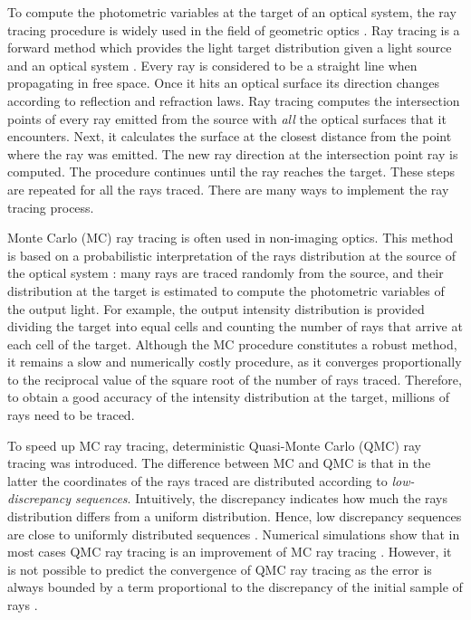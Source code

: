To compute the photometric variables at the target of an
optical system, the ray tracing procedure is widely used in the field of geometric optics \cite{glassner1989introduction}.
Ray tracing is a forward method which provides the light target distribution given a light source and an optical system \cite{Gross2005Handbook}. Every ray is considered to be a straight line when propagating in free space. Once it hits an optical surface its direction changes according to reflection and refraction laws. Ray tracing computes the intersection points of every ray emitted from the source with \textit{all} the optical surfaces that it encounters. Next, it calculates the surface at the closest distance from the point where the ray was emitted. The new ray direction at the intersection point ray is computed. The procedure continues until the ray reaches the target. These steps are repeated for all the rays traced.
There are many ways to implement the ray tracing process.

Monte Carlo (MC) ray tracing is often used in non-imaging
optics. This method is based on a probabilistic interpretation
of the rays distribution at the source of the optical
system \cite{liu2010precise,Ting:1}: many rays are traced randomly from the source,
and their distribution at the target is estimated to compute the
photometric variables of the output light. For example, the output intensity distribution is provided dividing the target into equal cells and counting the number of rays that arrive at each cell of the target. Although the MC
procedure constitutes a robust method, it remains a slow and
numerically costly procedure, as it converges proportionally
to the reciprocal value of the square root of the number of rays
traced. Therefore, to obtain a good accuracy of the intensity distribution at the target, millions of rays need to be traced.

To speed up MC ray tracing, deterministic Quasi-Monte Carlo (QMC) ray tracing was introduced. The difference between MC and QMC is that in the latter the coordinates of the rays traced are distributed according to \textit{low-discrepancy sequences}. Intuitively, the discrepancy indicates how much the rays distribution differs from a uniform distribution.  Hence, low discrepancy sequences are close to uniformly distributed sequences \cite{levy2002introduction}.
Numerical simulations show that in most cases QMC ray tracing is an improvement of MC ray tracing \cite{ohbuchi1996quasi, caflisch1998monte}. However, it is not possible to predict the convergence of QMC ray tracing as the error is always bounded by a term proportional to the discrepancy of the initial sample of rays \cite{tuffin2004randomization}.

